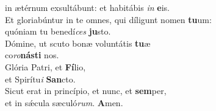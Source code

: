 \oddverse in ætérnum exsultábunt: et habitábis \textit{in} \textbf{e}is.\\
\evenverse Et gloriabúntur in te omnes, qui díligunt nomen \textbf{tu}um:~\*\\
\evenverse quóniam tu benedí\textit{ces} \textbf{ju}sto.\\
\oddverse Dómine, ut scuto bonæ voluntátis \textbf{tu}æ~\*\\
\oddverse co\textit{ro}\textbf{ná}\textbf{sti} nos.\\
\evenverse Glória Patri, et \textbf{Fí}lio,~\*\\
\evenverse et Spirítu\textit{i} \textbf{San}cto.\\
\oddverse Sicut erat in princípio, et nunc, et \textbf{sem}per,~\*\\
\oddverse et in sǽcula sæculó\textit{rum}. \textbf{A}men.\\
